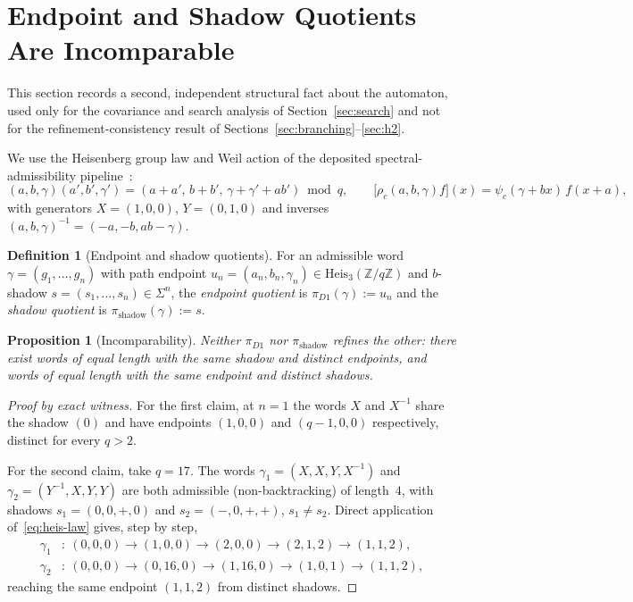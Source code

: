 \documentclass[11pt,a4paper]{article}
\newtheorem{proposition}[theorem]{Proposition}
\theoremstyle{definition}
\newtheorem{definition}[theorem]{Definition}
\theoremstyle{remark}
\newcommand{\Z}{\mathbb{Z}}
\newcommand{\Heis}{\mathrm{Heis}_3(\Z/q\Z)}
\newcommand{\Sh}{\Sigma}
\begin{document}
\section{Endpoint and Shadow Quotients Are Incomparable}
\label{sec:quotients}

This section records a second, independent structural fact about the automaton, used
only for the covariance and search analysis of Section~\ref{sec:search} and not for the
refinement-consistency result of Sections~\ref{sec:branching}--\ref{sec:h2}.

We use the Heisenberg group law and Weil action of the deposited spectral-admissibility
pipeline~\cite{Beau2026tb,Beau2026a37}:
\begin{equation}
  \label{eq:heis-law}
  (a,b,\gamma)(a',b',\gamma') = (a+a',\,b+b',\,\gamma+\gamma'+ab') \bmod q,
  \qquad
  \bigl[\rho_c(a,b,\gamma)f\bigr](x) = \psi_c(\gamma+bx)\,f(x+a),
\end{equation}
with generators $X=(1,0,0)$, $Y=(0,1,0)$ and inverses
$(a,b,\gamma)^{-1}=(-a,-b,ab-\gamma)$.

\begin{definition}[Endpoint and shadow quotients]
  \label{def:quotients}
  For an admissible word $\gamma=(g_1,\dots,g_n)$ with path endpoint
  $u_n=(a_n,b_n,\gamma_n) \in \Heis$ and $b$-shadow $s=(s_1,\dots,s_n)\in\Sh^n$, the
  \emph{endpoint quotient} is $\pi_{D1}(\gamma):=u_n$ and the \emph{shadow quotient} is
  $\pi_{\mathrm{shadow}}(\gamma):=s$.
\end{definition}

\begin{proposition}[Incomparability]
  \label{prop:incomparable}
  Neither $\pi_{D1}$ nor $\pi_{\mathrm{shadow}}$ refines the other: there exist words of
  equal length with the same shadow and distinct endpoints, and words of equal length
  with the same endpoint and distinct shadows.
\end{proposition}

\begin{proof}[Proof by exact witness]
  For the first claim, at $n=1$ the words $X$ and $X^{-1}$ share the shadow $(0)$ and
  have endpoints $(1,0,0)$ and $(q{-}1,0,0)$ respectively, distinct for every $q>2$.

  For the second claim, take $q=17$. The words
  $\gamma_1=(X,X,Y,X^{-1})$ and $\gamma_2=(Y^{-1},X,Y,Y)$ are both admissible
  (non-backtracking) of length~$4$, with shadows
  $s_1=(0,0,+,0)$ and $s_2=(-,0,+,+)$, $s_1 \ne s_2$. Direct application
  of~\eqref{eq:heis-law} gives, step by step,
  \begin{align*}
    \gamma_1&:\ (0,0,0) \to (1,0,0) \to (2,0,0) \to (2,1,2) \to (1,1,2), \\
    \gamma_2&:\ (0,0,0) \to (0,16,0) \to (1,16,0) \to (1,0,1) \to (1,1,2),
  \end{align*}
  reaching the same endpoint $(1,1,2)$ from distinct shadows.
\end{proof}
\end{document}
